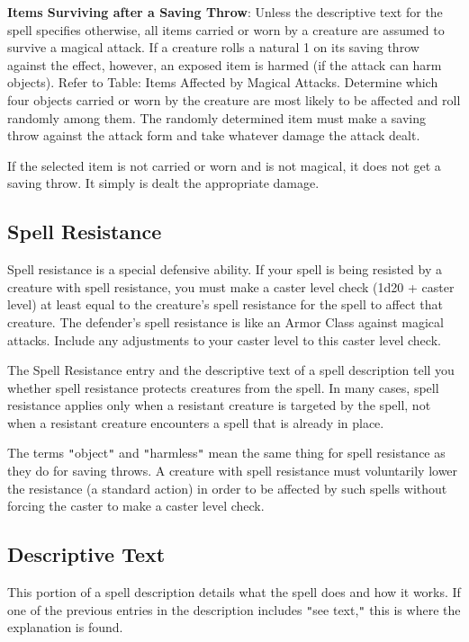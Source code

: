 				
\textbf{Items Surviving after a Saving Throw}: Unless the descriptive text for the spell specifies otherwise, all items carried or worn by a creature are assumed to survive a magical attack. If a creature rolls a natural 1 on its saving throw against the effect, however, an exposed item is harmed (if the attack can harm objects). Refer to Table: Items Affected by Magical Attacks. Determine which four objects carried or worn by the creature are most likely to be affected and roll randomly among them. The randomly determined item must make a saving throw against the attack form and take whatever damage the attack dealt.
				
If the selected item is not carried or worn and is not magical, it does not get a saving throw. It simply is dealt the appropriate damage.
				
\subsection{Spell Resistance}

				
Spell resistance is a special defensive ability. If your spell is being resisted by a creature with spell resistance, you must make a caster level check (1d20 + caster level) at least equal to the creature's spell resistance for the spell to affect that creature. The defender's spell resistance is like an Armor Class against magical attacks. Include any adjustments to your caster level to this caster level check.
				
The Spell Resistance entry and the descriptive text of a spell description tell you whether spell resistance protects creatures from the spell. In many cases, spell resistance applies only when a resistant creature is targeted by the spell, not when a resistant creature encounters a spell that is already in place.
				
The terms \texttt{{}"{}}object\texttt{{}"{}} and \texttt{{}"{}}harmless\texttt{{}"{}} mean the same thing for spell resistance as they do for saving throws. A creature with spell resistance must voluntarily lower the resistance (a standard action) in order to be affected by such spells without forcing the caster to make a caster level check.
				
\subsection{Descriptive Text}

				
This portion of a spell description details what the spell does and how it works. If one of the previous entries in the description includes \texttt{{}"{}}see text,\texttt{{}"{}} this is where the explanation is found. 
				
